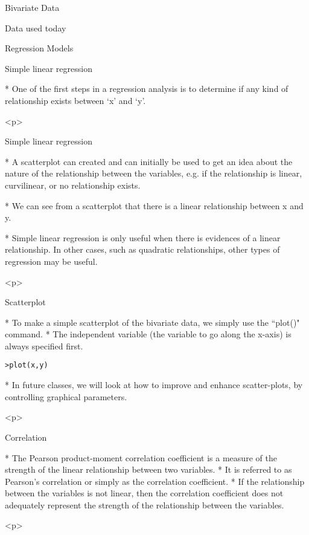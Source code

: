 \begin{slide}{Bivariate Data}
\begin{slide}{Data used today}
\begin{slide}{Regression Models}
\begin{slide}{Simple linear regression}
\begin{itemize}
* One of the first steps in a regression analysis is to determine if any
kind of relationship exists between `x' and `y'.



\end{itemize}
<p>
\begin{slide}{Simple linear regression}
\begin{itemize}

* A scatterplot can created and can initially be used to get an idea
about the nature of the relationship between the variables, e.g. if
the relationship is linear, curvilinear, or no relationship exists.

* We can see from a scatterplot that there is a linear relationship
between x and y.

* Simple linear regression is only useful when there is evidences of a linear relationship.
In other cases, such as quadratic relationships, other types of regression may be useful.

\end{itemize}
<p>

\begin{slide}{Scatterplot}
\begin{itemize}
* To make a simple scatterplot of the bivariate data, we simply use the
``plot()" command. * The independent variable (the variable to go along the x-axis) is always specified first.
\begin{verbatim}
>plot(x,y)
\end{verbatim}
* In future classes, we will look at how to improve and enhance scatter-plots, by controlling graphical parameters.
\end{itemize}
<p>

\begin{slide}{Correlation}
\begin{itemize}

* The Pearson product-moment correlation coefficient is a measure of the strength of the linear relationship between two variables. *  It is referred to as Pearson's correlation or simply as the correlation coefficient. * If the relationship between the variables is not linear, then the correlation coefficient does not adequately represent the strength of the relationship between the variables.
\end{itemize}
<p>





\end{slide}
\end{slide}
\end{slide}
\end{slide}
\end{slide}
\end{slide}
\end{slide}
